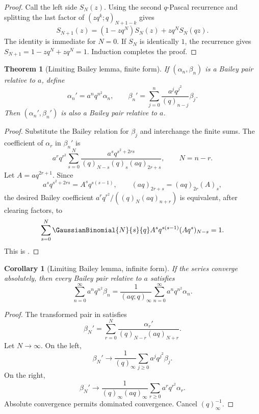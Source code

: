 \documentclass[11pt,a4paper,oneside,openany]{book}
\newtheorem{theorem}{Theorem}[chapter]
\newtheorem{corollary}[corollary]{Corollary}
\theoremstyle{definition}
\theoremstyle{remark}
\begin{document}
\begin{proof}
Call the left side $S_N(z)$.  Using the second $q$-Pascal recurrence and splitting the last factor of $(zq^k;q)_{N+1-k}$ gives
\[
 S_{N+1}(z)=(1-zq^N)S_N(z)+zq^NS_N(qz).
\]
The identity is immediate for $N=0$.  If $S_N$ is identically $1$, the recurrence gives $S_{N+1}=1-zq^N+zq^N=1$.  Induction completes the proof.
\end{proof}

\begin{theorem}[Limiting Bailey lemma, finite form]\label{thm:bailey-limit-finite}
If $(\alpha_n,\beta_n)$ is a Bailey pair relative to $a$, define
\[
 \alpha_n'=a^nq^{n^2}\alpha_n,
 \qquad
 \beta_n'=\sum_{j=0}^{n}\frac{a^jq^{j^2}}{(q)_{n-j}}\beta_j.
\]
Then $(\alpha_n',\beta_n')$ is also a Bailey pair relative to $a$.
\end{theorem}

\begin{proof}
Substitute the Bailey relation for $\beta_j$ and interchange the finite sums.  The coefficient of $\alpha_r$ in $\beta_n'$ is
\[
 a^rq^{r^2}\sum_{s=0}^{N}
 \frac{a^sq^{s^2+2rs}}
 {(q)_{N-s}(q)_s(aq)_{2r+s}},
 \qquad N=n-r.
\]
Let $A=aq^{2r+1}$.  Since
\[
 a^sq^{s^2+2rs}=A^sq^{s(s-1)},
 \qquad
 (aq)_{2r+s}=(aq)_{2r}(A)_s,
\]
the desired Bailey coefficient
\(
 a^rq^{r^2}/((q)_N(aq)_{n+r})
\)
is equivalent, after clearing factors, to
\[
 \sum_{s=0}^{N}\GaussianBinomial{N}{s}{q} A^sq^{s(s-1)}(Aq^s)_{N-s}=1.
\]
This is .
\end{proof}

\begin{corollary}[Limiting Bailey lemma, infinite form]\label{cor:bailey-limit-infinite}
If the series converge absolutely, then every Bailey pair relative to $a$ satisfies
\[
 \sum_{n=0}^{\infty}a^nq^{n^2}\beta_n
 =\frac1{(aq;q)_\infty}
 \sum_{n=0}^{\infty}a^nq^{n^2}\alpha_n.
\]
\end{corollary}

\begin{proof}
The transformed pair in  satisfies
\[
 \beta_N'=\sum_{r=0}^{N}
 \frac{\alpha_r'}{(q)_{N-r}(aq)_{N+r}}.
\]
Let $N\to\infty$.  On the left,
\[
 \beta_N'\longrightarrow\frac1{(q)_\infty}
 \sum_{j\ge0}a^jq^{j^2}\beta_j.
\]
On the right,
\[
 \beta_N'\longrightarrow
 \frac1{(q)_\infty(aq)_\infty}
 \sum_{r\ge0}a^rq^{r^2}\alpha_r.
\]
Absolute convergence permits dominated convergence.  Cancel $(q)_\infty^{-1}$.
\end{proof}
\end{document}
